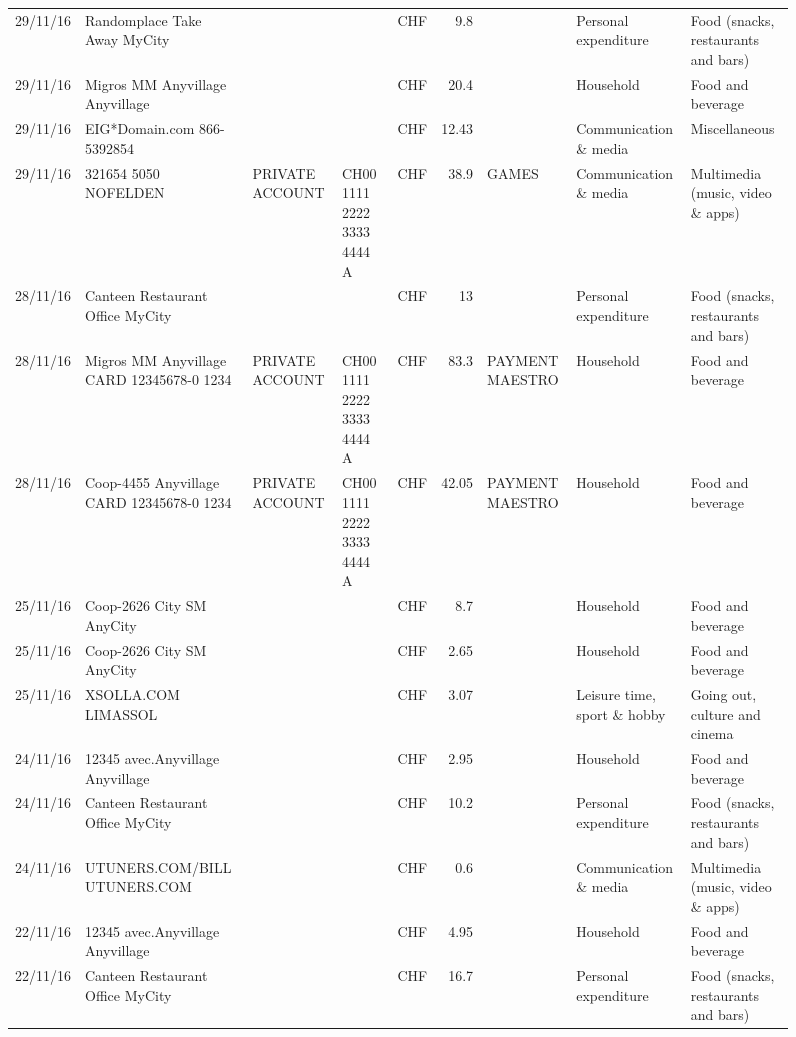 \begin{landscape}
\begin{sidewaysfigure}
\begin{table}[h]
\begin{center}
\begin{tabular}{rllllrlll}
		29/11/16 & Randomplace Take Away     MyCity &       &       & CHF   & 9.8   &       & Personal expenditure & Food (snacks, restaurants and bars) \\
		29/11/16 & Migros MM Anyvillage    Anyvillage &       &       & CHF   & 20.4  &       & Household & Food and beverage \\
		29/11/16 & EIG*Domain.com           866-5392854 &       &       & CHF   & 12.43 &       & Communication \& media & Miscellaneous \\
		29/11/16 & 321654 5050 NOFELDEN & PRIVATE ACCOUNT & CH00 1111 2222 3333 4444 A & CHF   & 38.9  & GAMES & Communication \& media & Multimedia (music, video \& apps) \\
		28/11/16 & Canteen Restaurant Office      MyCity &       &       & CHF   & 13    &       & Personal expenditure & Food (snacks, restaurants and bars) \\
		28/11/16 & Migros MM Anyvillage CARD 12345678-0 1234 & PRIVATE ACCOUNT & CH00 1111 2222 3333 4444 A & CHF   & 83.3  & PAYMENT MAESTRO & Household & Food and beverage \\
		28/11/16 & Coop-4455 Anyvillage CARD 12345678-0 1234 & PRIVATE ACCOUNT & CH00 1111 2222 3333 4444 A & CHF   & 42.05 & PAYMENT MAESTRO & Household & Food and beverage \\
		25/11/16 & Coop-2626 City SM        AnyCity &       &       & CHF   & 8.7   &       & Household & Food and beverage \\
		25/11/16 & Coop-2626 City SM        AnyCity &       &       & CHF   & 2.65  &       & Household & Food and beverage \\
		25/11/16 & XSOLLA.COM               LIMASSOL &       &       & CHF   & 3.07  &       & Leisure time, sport \& hobby & Going out, culture and cinema \\
		24/11/16 & 12345 avec.Anyvillage   Anyvillage &       &       & CHF   & 2.95  &       & Household & Food and beverage \\
		24/11/16 & Canteen Restaurant Office      MyCity &       &       & CHF   & 10.2  &       & Personal expenditure & Food (snacks, restaurants and bars) \\
		24/11/16 & UTUNERS.COM/BILL          UTUNERS.COM &       &       & CHF   & 0.6   &       & Communication \& media & Multimedia (music, video \& apps) \\
		22/11/16 & 12345 avec.Anyvillage   Anyvillage &       &       & CHF   & 4.95  &       & Household & Food and beverage \\
		22/11/16 & Canteen Restaurant Office      MyCity &       &       & CHF   & 16.7  &       & Personal expenditure & Food (snacks, restaurants and bars) \\

\end{tabular}
\end{center}
\end{table}
\end{sidewaysfigure}
\end{landscape}
